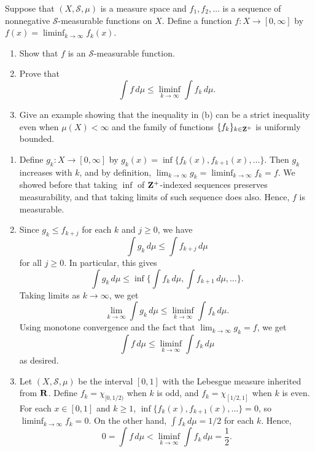 \documentclass[11pt,oneside]{book}
\begin{document}
\begin{exercise}
    Suppose that $(X, \mathscr{S}, \mu)$ is a measure space and $f_1, f_2, \ldots$ is a sequence of nonnegative $\mathscr{S}$-measurable functions on $X$. Define a function $f: X \to [0, \infty]$ by $f(x) = \liminf_{k \to \infty} f_k(x)$.
    \begin{enumerate}[label=(\alph*)]
        \item Show that $f$ is an $\mathscr{S}$-measurable function.

        \item Prove that \[\int f \, d\mu \leq \liminf_{k \to \infty} \int f_k \, d\mu.\]

        \item Give an example showing that the inequality in (b) can be a strict inequality even when $\mu(X) < \infty$ and the family of functions $\{f_k\}_{k \in \mathbf{Z}^+}$ is uniformly bounded.
    \end{enumerate}
\end{exercise}

\begin{solution}
    \begin{enumerate}[label=(\alph*)]
        \item Define $g_k: X \to [0, \infty]$ by $g_k(x) = \inf\{f_k(x), f_{k+1}(x), \ldots\}$. Then $g_k$ increases with $k$, and by definition, $\lim_{k \to \infty} g_k = \liminf_{k \to \infty} f_k = f$. We showed before that taking $\inf$ of $\mathbf{Z}^+$-indexed sequences preserves measurability, and that taking limits of such sequence does also. Hence, $f$ is measurable.

        \item Since $g_k \leq f_{k+j}$ for each $k$ and $j \geq 0$, we have \[\int g_k \, d\mu \leq \int f_{k+j} \, d\mu\] for all $j \geq 0$. In particular, this gives \[\int g_k \, d\mu \leq \inf\bigg\{ \int f_{k} \, d\mu, \int f_{k+1} \, d\mu, \ldots \bigg\}.\] Taking limits as $k \to \infty$, we get \[\lim_{k \to \infty} \int g_k \, d\mu \leq \liminf_{k \to \infty} \int f_k \, d\mu.\] Using monotone convergence and the fact that $\lim_{k \to \infty} g_k = f$, we get \[\int f \, d\mu \leq \liminf_{k \to \infty} \int f_k \, d\mu\] as desired.

        \item Let $(X, \mathscr{S}, \mu)$ be the interval $[0, 1]$ with the Lebesgue measure inherited from $\mathbf{R}$. Define $f_k = \chi_{[0, 1/2)}$ when $k$ is odd, and $f_k = \chi_{[1/2, 1]}$ when $k$ is even. For each $x \in [0, 1]$ and $k \geq 1$, $\inf\{f_k(x), f_{k+1}(x), \ldots\} = 0$, so $\liminf_{k \to \infty} f_k = 0$. On the other hand, $\int f_k \, d\mu = 1/2$ for each $k$. Hence, \[0 = \int f \, d\mu < \liminf_{k \to \infty} \int f_k \, d\mu = \frac 12.\]
    \end{enumerate}
\end{solution}
\end{document}
